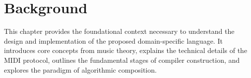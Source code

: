 \chapter{Background}\label{ch:background}

This chapter provides the foundational context necessary to understand the design and implementation of the
proposed domain-specific language.
It introduces core concepts from music theory, explains the technical details of the MIDI protocol, outlines
the fundamental stages of compiler construction, and explores the paradigm of algorithmic composition.





